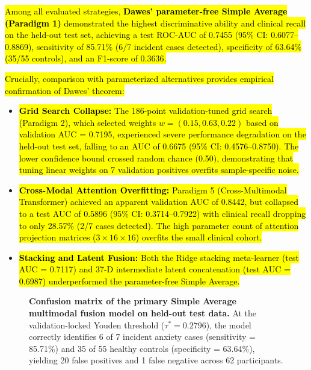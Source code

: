 \documentclass[10pt,letterpaper]{article}
\begin{document}
\hl{Among all evaluated strategies, \textbf{Dawes' parameter-free Simple Average (Paradigm 1)} demonstrated the highest discriminative ability and clinical recall on the held-out test set, achieving a test ROC-AUC of 0.7455 (95\% CI: 0.6077--0.8869), sensitivity of 85.71\% (6/7 incident cases detected), specificity of 63.64\% (35/55 controls), and an F1-score of 0.3636.}

\hl{Crucially, comparison with parameterized alternatives provides empirical confirmation of Dawes' theorem:}
\begin{itemize}
    \item \hl{\textbf{Grid Search Collapse:} The 186-point validation-tuned grid search (Paradigm 2), which selected weights $w = (0.15, 0.63, 0.22)$ based on validation AUC = 0.7195, experienced severe performance degradation on the held-out test set, falling to an AUC of 0.6675 (95\% CI: 0.4576--0.8750). The lower confidence bound crossed random chance (0.50), demonstrating that tuning linear weights on 7 validation positives overfits sample-specific noise.}
    \item \hl{\textbf{Cross-Modal Attention Overfitting:} Paradigm 5 (Cross-Multimodal Transformer) achieved an apparent validation AUC of 0.8442, but collapsed to a test AUC of 0.5896 (95\% CI: 0.3714--0.7922) with clinical recall dropping to only 28.57\% (2/7 cases detected). The high parameter count of attention projection matrices ($3 \times 16 \times 16$) overfits the small clinical cohort.}
    \item \hl{\textbf{Stacking and Latent Fusion:} Both the Ridge stacking meta-learner (test AUC = 0.7117) and 37-D intermediate latent concatenation (test AUC = 0.6987) underperformed the parameter-free Simple Average.}
\end{itemize}

\begin{figure}[!h]
\caption{\textbf{Confusion matrix of the primary Simple Average multimodal fusion model on held-out test data.}
At the validation-locked Youden threshold ($\tau^* = 0.2796$), the model correctly identifies 6 of 7 incident anxiety cases (sensitivity = 85.71\%) and 35 of 55 healthy controls (specificity = 63.64\%), yielding 20 false positives and 1 false negative across 62 participants.}
\label{fig:confusion_matrix}
\end{figure}
\end{document}
